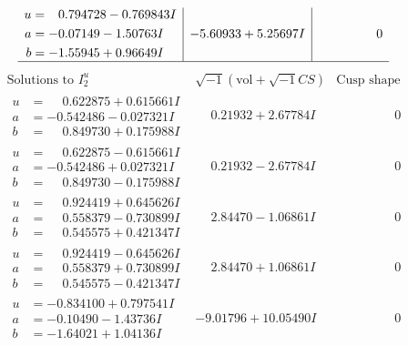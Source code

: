 \documentclass[1p]{elsarticle_modified}
\theoremstyle{definition}
\newcommand{\I}{\sqrt{-1}}
\begin{document}
$$\begin{array}{c|c|c}
\begin{aligned}
u &= \phantom{-}0.794728 - 0.769843 I \\
a &= -0.07149 - 1.50763 I \\
b &= -1.55945 + 0.96649 I\end{aligned}
 & -5.60933 + 5.25697 I & \phantom{-0.000000 } 0\\
 \hline 
 \end{array}$$\newpage$$\begin{array}{c|c|c}  
\text{Solutions to }I^u_{2}& \I (\text{vol} + \sqrt{-1}CS) & \text{Cusp shape}\\
 \hline 
\begin{aligned}
u &= \phantom{-}0.622875 + 0.615661 I \\
a &= -0.542486 - 0.027321 I \\
b &= \phantom{-}0.849730 + 0.175988 I\end{aligned}
 & \phantom{-}0.21932 + 2.67784 I & \phantom{-0.000000 } 0 \\ \hline\begin{aligned}
u &= \phantom{-}0.622875 - 0.615661 I \\
a &= -0.542486 + 0.027321 I \\
b &= \phantom{-}0.849730 - 0.175988 I\end{aligned}
 & \phantom{-}0.21932 - 2.67784 I & \phantom{-0.000000 } 0 \\ \hline\begin{aligned}
u &= \phantom{-}0.924419 + 0.645626 I \\
a &= \phantom{-}0.558379 - 0.730899 I \\
b &= \phantom{-}0.545575 + 0.421347 I\end{aligned}
 & \phantom{-}2.84470 - 1.06861 I & \phantom{-0.000000 } 0 \\ \hline\begin{aligned}
u &= \phantom{-}0.924419 - 0.645626 I \\
a &= \phantom{-}0.558379 + 0.730899 I \\
b &= \phantom{-}0.545575 - 0.421347 I\end{aligned}
 & \phantom{-}2.84470 + 1.06861 I & \phantom{-0.000000 } 0 \\ \hline\begin{aligned}
u &= -0.834100 + 0.797541 I \\
a &= -0.10490 - 1.43736 I \\
b &= -1.64021 + 1.04136 I\end{aligned}
 & -9.01796 + 10.05490 I & \phantom{-0.000000 } 0 \\ \hline\begin{aligned}

\end{aligned}
\end{array}$$
\end{document}
